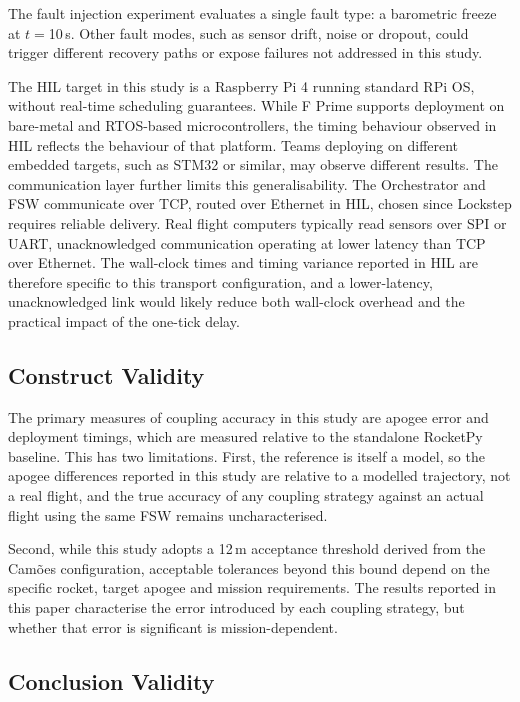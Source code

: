 The fault injection experiment evaluates a single fault type: a barometric freeze at $t=$10\,s. Other fault modes, such as sensor drift, noise or dropout, could trigger different recovery paths or expose failures not addressed in this study.

The HIL target in this study is a Raspberry Pi 4 running standard RPi OS, without real-time scheduling guarantees. While F Prime supports deployment on bare-metal and RTOS-based microcontrollers, the timing behaviour observed in HIL reflects the behaviour of that platform. Teams deploying on different embedded targets, such as STM32 or similar, may observe different results. The communication layer further limits this generalisability. The Orchestrator and FSW communicate over TCP, routed over Ethernet in HIL, chosen since Lockstep requires reliable delivery. Real flight computers typically read sensors over SPI or UART, unacknowledged communication operating at lower latency than TCP over Ethernet. The wall-clock times and timing variance reported in HIL are therefore specific to this transport configuration, and a lower-latency, unacknowledged link would likely reduce both wall-clock overhead and the practical impact of the one-tick delay.



\subsection{Construct Validity}

The primary measures of coupling accuracy in this study are apogee error and deployment timings, which are measured relative to the standalone RocketPy baseline. This has two limitations. First, the reference is itself a model, so the apogee differences reported in this study are relative to a modelled trajectory, not a real flight, and the true accuracy of any coupling strategy against an actual flight using the same FSW remains uncharacterised.

Second, while this study adopts a 12\,m acceptance threshold derived from the Camões configuration, acceptable tolerances beyond this bound depend on the specific rocket, target apogee and mission requirements. The results reported in this paper characterise the error introduced by each coupling strategy, but whether that error is significant is mission-dependent.

\subsection{Conclusion Validity}

